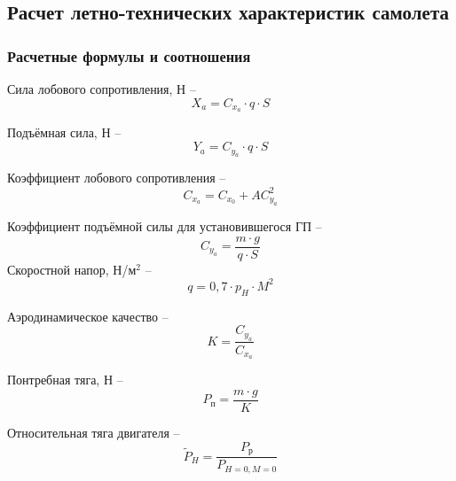 \subsection{Расчет летно-технических характеристик самолета}
\label{sec:Расчет летно-технических характеристик самолета}
\subsubsection{Расчетные формулы и соотношения}
\pagestyle{fancy}
\fancyhf{}
\rfoot{\thepage}


Сила лобового сопротивления, Н -- 
\begin{equation}
    \label{eq:Сила лобового сопротивления}
    X_a = C_{x_a} \cdot q \cdot S
\end{equation}

Подъёмная сила, Н -- 
\begin{equation}
    \label{eq:Подъёмная сила}
    Y_a = C_{y_a} \cdot q \cdot S
\end{equation}

Коэффициент лобового сопротивления -- 
\begin{equation}
    \label{eq:коэффициент лобового сопротивления}
    C_{x_a} = C_{x_0} + AC_{y_a}^2
\end{equation}

Коэффициент подъёмной силы для установившегося ГП -- 
\begin{equation}
    \label{eq:Коэффициент подъёмной силы для установившегося ГП}
    C_{y_a} = \frac{m \cdot g}{q \cdot S}
\end{equation}
Скоростной напор, Н/м$^2$ -- 
\begin{equation}
    \label{eq:Скоростной напор}
    q = 0,7 \cdot p_H \cdot M^2
\end{equation}

Аэродинамическое качество -- 
\begin{equation}
    \label{eq:Аэродинамическое качество}
    K = \frac{C_{y_a}}{C_{x_a}}
\end{equation}

Понтребная тяга, Н -- 
\begin{equation}
    \label{eq:Понтребная тяга}
    P_\text{п} = \frac{m \cdot g}{K}
\end{equation}

Относительная тяга двигателя -- 
\begin{equation}
    \label{Относительная тяга двигателя}
    \tilde{P}_H = \frac{P_\text{р}}{P_{H=0,M=0}}
\end{equation}

